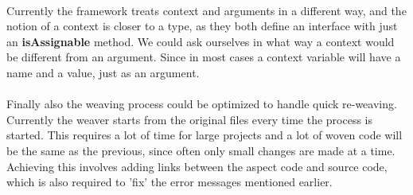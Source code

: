 \documentclass[a4paper]{report}
\begin{document}
\\
Currently the framework treats context and arguments in a different way, and the notion of a context is closer to a type, as they both define an interface with just an \textbf{isAssignable} method. We could ask ourselves in what way a context would be different from an argument. Since in most cases a context variable will have a name and a value, just as an argument.\\
\\
Finally also the weaving process could be optimized to handle quick re-weaving. Currently the weaver starts from the original files every time the process is started. This requires a lot of time for large projects and a lot of woven code will be the same as the previous, since often only small changes are made at a time. Achieving this involves adding links between the aspect code and source code, which is also required to 'fix' the error messages mentioned earlier.
\end{document}

